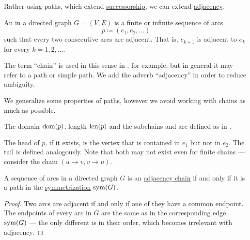 \begin{definition}\label{def:graph_adjacency_chain}
  Rather using paths, which extend \hyperref[def:graph/adjacency]{successorship}, we can extend \hyperref[def:graph/adjacency]{adjacency}.

  An  in a directed graph \( G = (V, E) \) is a finite or infinite sequence of arcs
  \begin{equation*}
    p \coloneqq (e_1, e_2, \ldots)
  \end{equation*}
  such that every two consecutive arcs are adjacent. That is, \( e_{k+1} \) is adjacent to \( e_k \) for every \( k = 1, 2, \ldots \).

  The term \enquote{chain} is used in this sense in \cite[ch. 1, sec. 3.1]{GondranMinoux1984Graphs}, for example, but in general it may refer to a path or simple path. We add the adverb \enquote{adjacency} in order to reduce ambiguity.

  We generalize some properties of paths, however we avoid working with chains as much as possible.

  The domain \( \operatorname{dom}(p) \), length \( \operatorname{len}(p) \) and the subchains and are defined as in .

  The head of \( p \), if it exists, is the vertex that is contained in \( e_1 \) but not in \( e_2 \). The tail is defined analogously. Note that both may not exist even for finite chains --- consider the chain \( (u \to v, v \to u) \).
\end{definition}

\begin{proposition}\label{thm:graph_chains}
  A sequence of arcs in a directed graph \( G \) is an \hyperref[def:graph_adjacency_chain]{adjacency chain} if and only if it is a path in the \hyperref[def:graph/symmetrization]{symmetrization} \( \operatorname{sym}(G) \).
\end{proposition}
\begin{proof}
  Two arcs are adjacent if and only if one of they have a common endpoint. The endpoints of every arc in \( G \) are the same as in the corresponding edge \( \operatorname{sym}(G) \) --- the only different is in their order, which becomes irrelevant with adjacency.
\end{proof}

